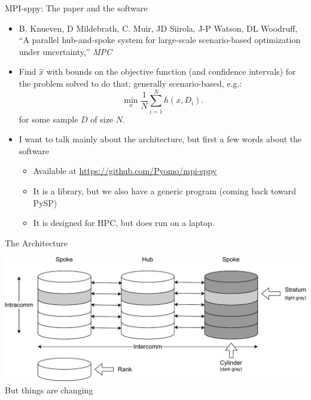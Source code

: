 \documentclass[9pt,usenames,dvipsnames]{beamer}
\begin{document}
\begin{frame}{MPI-sppy: The paper and the software}
\begin{itemize}
\item B. Knueven, D Mildebrath, C. Muir, JD Siirola, J-P Watson, DL Woodruff, ``A parallel hub-and-spoke system for large-scale scenario-based optimization under uncertainty,'' {\em MPC}
\item Find $\hat{x}$ with bounds on the objective function (and confidence intervals) for the problem solved to do that; generally scenario-based, e.g.:
  $$
   \min_x \frac{1}{N} \sum_{i=1}^N h(x, D_i).
   $$
   for some sample $D$ of size $N$.
\item I want to talk mainly about the architecture, but first a few words about the software 
  \begin{itemize}
  \item Available at \url{https://github.com/Pyomo/mpi-sppy}
  \item It is a library, but we also have a generic program (coming back toward PySP)
    \item It is designed for HPC, but does run on a laptop.
    \end{itemize}
\end{itemize}
\end{frame}

\begin{frame}{The Architecture}
  \subtitle{MPI: Message Passing Interface}

\includegraphics[width=1.0\linewidth]{hubspoke.pdf}
But things are changing
\end{frame}
\end{document}
